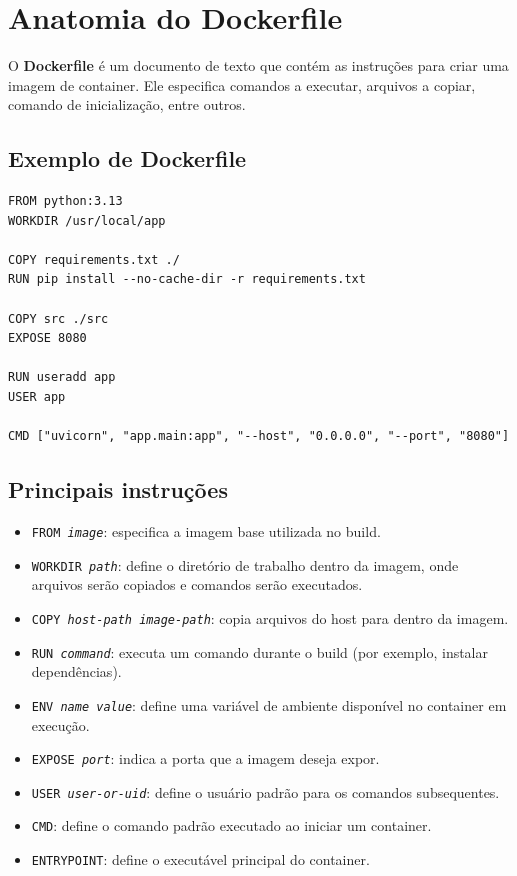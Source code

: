 \section{Anatomia do Dockerfile}

O \textbf{Dockerfile} é um documento de texto que contém as instruções para criar uma imagem de container. Ele especifica comandos a executar, arquivos a copiar, comando de inicialização, entre outros.

\subsection{Exemplo de Dockerfile}

\begin{verbatim}
FROM python:3.13
WORKDIR /usr/local/app

COPY requirements.txt ./
RUN pip install --no-cache-dir -r requirements.txt

COPY src ./src
EXPOSE 8080

RUN useradd app
USER app

CMD ["uvicorn", "app.main:app", "--host", "0.0.0.0", "--port", "8080"]
\end{verbatim}

\subsection{Principais instruções}

\begin{itemize}
    \item \texttt{FROM \textit{image}}: especifica a imagem base utilizada no build.
    \item \texttt{WORKDIR \textit{path}}: define o diretório de trabalho dentro da imagem, onde arquivos serão copiados e comandos serão executados.
    \item \texttt{COPY \textit{host-path} \textit{image-path}}: copia arquivos do host para dentro da imagem.
    \item \texttt{RUN \textit{command}}: executa um comando durante o build (por exemplo, instalar dependências).
    \item \texttt{ENV \textit{name} \textit{value}}: define uma variável de ambiente disponível no container em execução.
    \item \texttt{EXPOSE \textit{port}}: indica a porta que a imagem deseja expor.
    \item \texttt{USER \textit{user-or-uid}}: define o usuário padrão para os comandos subsequentes.
    \item \texttt{CMD}: define o comando padrão executado ao iniciar um container.
    \item \texttt{ENTRYPOINT}: define o executável principal do container.
\end{itemize}

